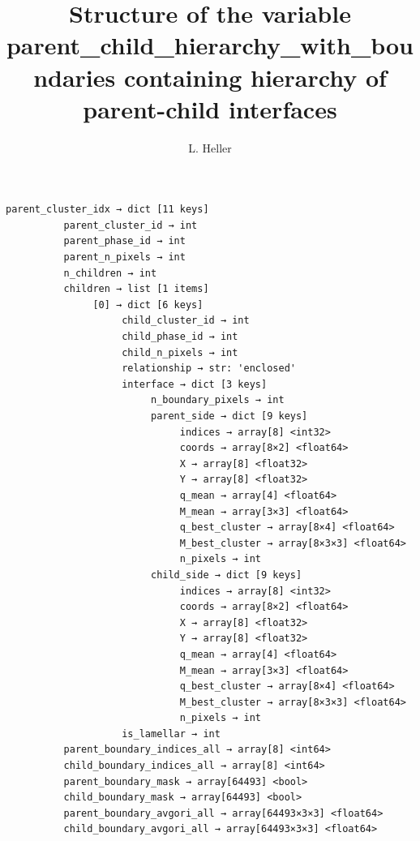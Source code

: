 \documentclass[a4paper,10pt]{article}
\title{Structure of the variable parent\_child\_hierarchy\_with\_boundaries containing hierarchy of parent-child interfaces}
\author{L. Heller}
\begin{document}
\maketitle
\begin{verbatim}
parent_cluster_idx → dict [11 keys]
          parent_cluster_id → int
          parent_phase_id → int
          parent_n_pixels → int
          n_children → int
          children → list [1 items]
               [0] → dict [6 keys]
                    child_cluster_id → int
                    child_phase_id → int
                    child_n_pixels → int
                    relationship → str: 'enclosed'
                    interface → dict [3 keys]
                         n_boundary_pixels → int
                         parent_side → dict [9 keys]
                              indices → array[8] <int32>
                              coords → array[8×2] <float64>
                              X → array[8] <float32>
                              Y → array[8] <float32>
                              q_mean → array[4] <float64>
                              M_mean → array[3×3] <float64>
                              q_best_cluster → array[8×4] <float64>
                              M_best_cluster → array[8×3×3] <float64>
                              n_pixels → int
                         child_side → dict [9 keys]
                              indices → array[8] <int32>
                              coords → array[8×2] <float64>
                              X → array[8] <float32>
                              Y → array[8] <float32>
                              q_mean → array[4] <float64>
                              M_mean → array[3×3] <float64>
                              q_best_cluster → array[8×4] <float64>
                              M_best_cluster → array[8×3×3] <float64>
                              n_pixels → int
                    is_lamellar → int
          parent_boundary_indices_all → array[8] <int64>
          child_boundary_indices_all → array[8] <int64>
          parent_boundary_mask → array[64493] <bool>
          child_boundary_mask → array[64493] <bool>
          parent_boundary_avgori_all → array[64493×3×3] <float64>
          child_boundary_avgori_all → array[64493×3×3] <float64>
\end{verbatim}
\end{document}
